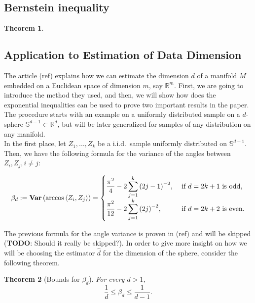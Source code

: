 \documentclass[12pt]{exam}
\def\R{\ensuremath{\mathbb{R}}}
\def\S{\ensuremath{\mathbb{S}}}
\def\Var{\ensuremath{\mathbf{Var}}\,}
\newtheorem{theorem}{Theorem}[section]
\theoremstyle{remark}
\newcommand{\angles}[1]{\ensuremath{\left\langle}#1\ensuremath{\right\rangle} }
\begin{document}
\subsection*{Bernstein inequality}

\begin{theorem}
  
\end{theorem}

\subsection{Application to Estimation of Data Dimension}
The article (ref) explains how we can estimate the dimension $d$ of a manifold $M$ embedded on a Euclidean space of dimension $m$, say $\R^m$. First, we are going to introduce the method they used, and then, we will show how does the exponential inequalities can be used to prove two important results in the paper. The procedure starts with an example on a uniformly distributed sample on a $d$-sphere $\S^{d-1} \subset \R^d$, but will be later generalized for samples of any distribution on any manifold.\\[4mm]

In the first place, let $Z_1, \ldots, Z_k$ be a i.i.d.\ sample uniformly distributed on $\S^{d-1}$. Then, we have the following formula for the variance of the angles between $Z_i,Z_j, i\neq j$:

\begin{equation}\label{ade:1}\everymath{\displaystyle}
  \beta_d := \Var(\arccos \angles{Z_i,Z_j}) = \begin{cases}
    \frac{\pi^2}{4} - 2 \sum_{j = 1}^{k} {(2j-1)}^{-2}, & \mbox{ if } d = 2k+1 \mbox{ is odd},\\
    \frac{\pi^2}{12}- 2 \sum_{j = 1}^{k} {(2j)}^{-2}, & \mbox{ if } d = 2k+2 \mbox{ is even.}
  \end{cases}
\end{equation}

The previous formula for the angle variance is proven in (ref) and will be skipped (\textbf{TODO}: Should it really be skipped?). In order to give more insight on how we will be choosing the estimator $\widehat{d}$ for the dimension of the sphere, consider the following theorem.

\begin{theorem}[Bounds for $\beta_d$]\label{ade:T1}
  For every $d > 1$,
  \[ \frac{1}{d} \leq \beta_d \leq \frac{1}{d-1}. \] 
\end{theorem}
\end{document}
